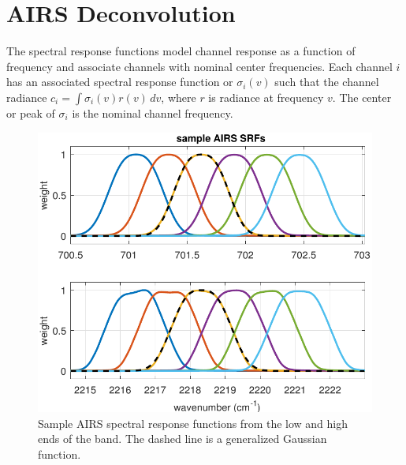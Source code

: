 \documentclass[journal]{IEEEtran}
\begin{document}
\section{AIRS Deconvolution}
\label{decon}

The {\airs} spectral response functions model channel response as a
function of frequency and associate channels with nominal center
frequencies.  Each {\airs} channel $i$ has an associated spectral
response function or {\srf} $\sigma_i(v)$ such that the channel
radiance $c_i = \int \sigma_i(v)r(v)\,dv$, where $r$ is radiance at
frequency $v$.  The center or peak of $\sigma_i$ is the nominal
channel frequency.

\begin{figure} %
  \centering
  \includegraphics[width=\linewidth]{figures/airs_sample_SRF.pdf}
  \caption{Sample AIRS spectral response functions from the low
    and high ends of the band.  The dashed line is a generalized
    Gaussian function.}
  \label{srfs1}
\end{figure}
\end{document}
